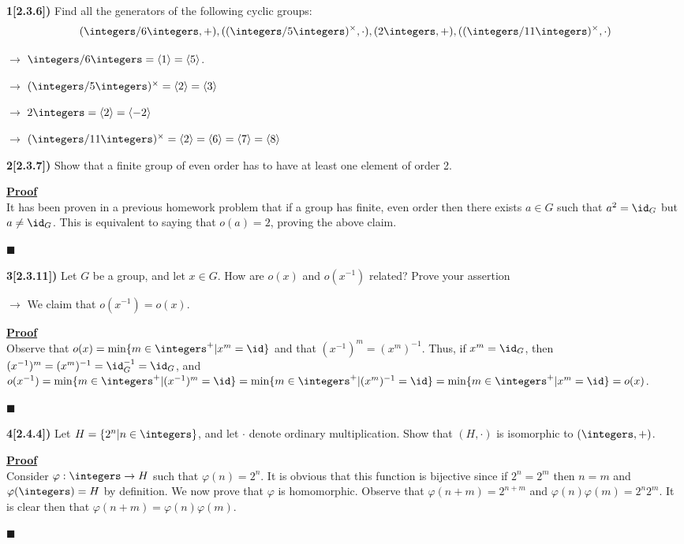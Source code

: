 \documentclass[12pt,a4paper]{article}
\newcommand{\prob}[2]{\textbf{#1)} #2}
\newenvironment{proof}
{
\textbf{\underline{Proof}} \\
}
{
\begin{flushright}
$\blacksquare$
\end{flushright}}
\begin{document}
\prob{1[2.3.6]}{Find all the generators of the following cyclic groups: 
\begin{align*}
(\integers/6\integers,+),((\integers/5\integers)^{\times},\cdot),(2\integers,+),((\integers/11\integers)^{\times},\cdot)
\end{align*}
}
$\rightarrow$ $\integers/6\integers = \langle 1 \rangle = \langle 5 \rangle$.

$\rightarrow$ $(\integers/5\integers)^{\times} = \langle 2 \rangle = \langle 3 \rangle$

$\rightarrow$ $2\integers = \langle 2 \rangle = \langle -2 \rangle$

$\rightarrow$ $(\integers/11\integers)^{\times} = \langle 2 \rangle = \langle 6 \rangle = \langle 7 \rangle = \langle 8 \rangle$

\prob{2[2.3.7]}{Show that a finite group of even order has to have at least one element of order 2.}

\begin{proof}
It has been proven in a previous homework problem that if a group has finite, even order then there exists $a \in G$ such that $a^2 = \id_G$ but $a \not= \id_G$. This is equivalent to saying that $o(a) = 2$, proving the above claim.
\end{proof}

\prob{3[2.3.11]}{Let $G$ be a group, and let $x \in G$. How are $o(x)$ and $o(x^{-1})$ related? Prove your assertion}

$\rightarrow$ We claim that $o(x^{-1}) = o(x)$.

\begin{proof}
Observe that $o(x) = \min\{m\in\integers^{+}|x^{m}=\id\}$ and that $(x^{-1})^m = (x^{m})^{-1}$. Thus, if $x^m = \id_G$, then $(x^{-1})^{m} = (x^{m})^{-1} = \id_G^{-1} = \id_{G}$, and $o(x^{-1}) = \min\{m\in\integers^{+}|(x^{-1})^{m}=\id\} = \min\{m\in\integers^{+}|(x^{m})^{-1}=\id\} = \min\{m\in\integers^{+}|x^{m}=\id\} =  o(x)$.
\end{proof}

\prob{4[2.4.4]}{Let $H = \{2^{n}|n\in\integers\}$, and let $\cdot$ denote ordinary multiplication. Show that $(H,\cdot)$ is isomorphic to $(\integers,+)$.}

\begin{proof}
Consider $\varphi: \integers \rightarrow H$ such that $\varphi(n) = 2^n$. It is obvious that this function is bijective since if $2^n = 2^m$ then $n=m$ and $\varphi(\integers) = H$ by definition. We now prove that $\varphi$ is homomorphic. Observe that $\varphi(n+m) = 2^{n+m}$ and $\varphi(n)\varphi(m) = 2^n2^m$. It is clear then that $\varphi(n+m) = \varphi(n)\varphi(m)$.
\end{proof}
\end{document}
